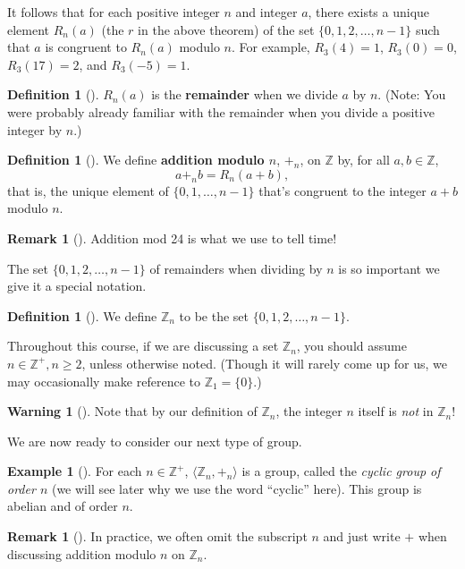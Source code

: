 \documentclass[10pt,]{book}
\newcommand{\terminology}[1]{\textbf{#1}}
\theoremstyle{plain}
\theoremstyle{definition}
\newtheorem{definition}[theorem]{Definition}
\theoremstyle{definition}
\newtheorem{remark}[theorem]{Remark}
\newtheorem{warning}[theorem]{Warning}
\theoremstyle{definition}
\newtheorem{example}[theorem]{Example}
\theoremstyle{definition}
\numberwithin{equation}{section}
\def\Z{\mathbb{Z}}
\begin{document}
It follows that for each positive integer \(n\) and integer \(a\), there exists a unique element \(R_n(a)\) (the \(r\) in the above theorem) of the set \(\{0,1,2,\ldots, n-1\}\) such that \(a\) is congruent to \(R_n(a)\) modulo \(n\). For example, \(R_3(4)=1\), \(R_3(0)=0\), \(R_3(17)=2\), and \(R_3(-5)=1\).%
\begin{definition}[{}]\label{definition-24}
\(R_n(a)\) is the \terminology{remainder} when we divide \(a\) by \(n\). (Note: You were probably already familiar with the remainder when you divide a positive integer by \(n\).)%
\end{definition}
\begin{definition}[{}]\label{definition-25}
We define \terminology{addition modulo \(n\)}, \(+_n\), on \(\Z\) by, for all \(a,b\in \Z\),%
\begin{equation*}
a+_n b=R_n(a+b),
\end{equation*}
that is, the unique element of \(\{0,1,\ldots, n-1\}\) that's congruent to the integer \(a+b\) modulo \(n\).%
\end{definition}
\begin{remark}[]\label{remark-13}
Addition mod 24 is what we use to tell time!%
\end{remark}
The set \(\{0,1,2,\ldots, n-1\}\) of remainders when dividing by \(n\) is so important we give it a special notation.%
\begin{definition}[{}]\label{definition-26}
We define \(\Z_n\) to be the set \(\{0,1,2,\ldots,n-1\}\).%
\end{definition}
Throughout this course, if we are discussing a set \(\Z_n\), you should assume \(n\in \Z^+, n\geq 2\), unless otherwise noted. (Though it will rarely come up for us, we may occasionally make reference to \(\Z_1=\{0\}\).)%
\begin{warning}[]\label{warning-13}
Note that by our definition of \(\Z_n\), the integer \(n\) itself is \emph{not} in \(\Z_n\)!%
\end{warning}
We are now ready to consider our next type of group.%
\begin{example}[]\label{example-16}
For each \(n\in \Z^+\), \(\langle \Z_n,+_n\rangle\) is a group, called the \emph{cyclic group of order \(n\)} (we will see later why we use the word ``cyclic'' here). This group is abelian and of order \(n\).%
\end{example}
\begin{remark}[]\label{remark-14}
In practice, we often omit the subscript \(n\) and just write \(+\) when discussing addition modulo \(n\) on \(\Z_n\).%
\end{remark}
\end{document}
